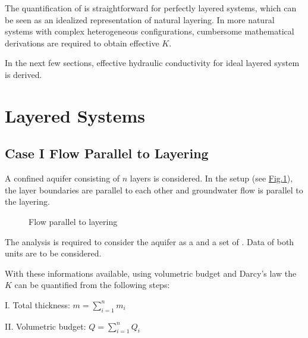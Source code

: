 \documentclass[letterpaper,10pt,english]{jupyterBook}
\begin{document}
\sphinxAtStartPar
The quantification of  is straight\sphinxhyphen{}forward for perfectly layered systems, which can be seen as an idealized representation of natural layering. In more natural systems with complex heterogeneous configurations, cumbersome mathematical derivations are required to obtain effective \(K\).

\sphinxAtStartPar
In the next few sections, effective hydraulic conductivity for ideal layered system is derived.


\section{Layered Systems}
\label{\detokenize{content/flow/L5/15_het_iso:layered-systems}}

\subsection{Case I \sphinxhyphen{} Flow Parallel to Layering}
\label{\detokenize{content/flow/L5/15_het_iso:case-i-flow-parallel-to-layering}}
\sphinxAtStartPar
A confined aquifer consisting of \(n\) layers is considered. In the set\sphinxhyphen{}up (see \hyperref[\detokenize{content/flow/L5/15_het_iso:flow-parallel}]{Fig.\@ \ref{\detokenize{content/flow/L5/15_het_iso:flow-parallel}}}), the layer boundaries are parallel to each other and groundwater flow is parallel to the layering.

\begin{figure}[htbp]
\centering
\capstart

\noindent{}
\caption{Flow parallel to layering}\label{\detokenize{content/flow/L5/15_het_iso:flow-parallel}}\end{figure}

\sphinxAtStartPar
The analysis is required to consider the aquifer as a  and a set of . Data of both units are to be considered.

\sphinxAtStartPar
With these informations available, using volumetric budget and Darcy’s law the  \(K\) can be quantified from the following steps:

\sphinxAtStartPar
I. Total thickness: \(m = \sum\limits_{i=1}^n m_i\)

\sphinxAtStartPar
II. Volumetric budget: \(Q =  \sum\limits_{i=1}^n Q_i\)
\end{document}
